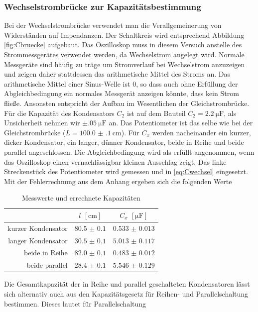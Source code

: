 \subsubsection{Wechselstrombrücke zur Kapazitätsbestimmung}
Bei der Wechselstrombrücke verwendet man die Verallgemeinerung von Widerständen auf Impendanzen. Der Schaltkreis wird entsprechend Abbildung \ref{fig:Cbruecke} aufgebaut. Das Oszilloskop muss in diesem Versuch anstelle des Strommessgerätes verwendet werden, da Wechselstrom angelegt wird. Normale Messgeräte sind häufig zu träge um Stromverlauf bei Wechselstrom anzuzeigen und zeigen daher stattdessen das arithmetische Mittel des Stroms an. Das arithmetische Mittel einer Sinus-Welle ist $ 0 $, so dass auch ohne Erfüllung der Abgleichbedingung ein normales Messgerät anzeigen könnte, dass kein Strom fließe. Ansonsten entspricht der Aufbau im Wesentlichen der Gleichstrombrücke. Für die Kapazität des Kondensators $ C_2 $ ist auf dem Bauteil $ C_2 = \SI{2.2}{\micro\farad} $, als Unsicherheit nehmen wir $ \pm \SI{.05}{\micro\farad} $ an. Das Potentiometer ist das selbe wie bei der Gleichstrombrücke ($ L = \SI{100.0(1)}{\centi\meter} $). Für $ C_x $ werden nacheinander ein kurzer, dicker Kondensator, ein langer, dünner Kondensator, beide in Reihe und beide parallel angeschlossen. Die Abgleichbedingung wird als erfüllt angenommen, wenn das Oszilloskop einen vernachlässigbar kleinen Ausschlag zeigt. Das linke Streckenstück des Potentiometer wird gemessen und in \eqref{eq:Cwechsel} eingesetzt. Mit der Fehlerrechnung aus dem Anhang ergeben sich die folgenden Werte
\begin{table}[H]
	\centering
	\begin{tabular}{r|cc}
		 & $ l $ $ [\si{\centi\meter}] $ & $ C_x $ $ [\si{\micro\farad}] $ \\\hline
		 kurzer Kondensator & $ \num{80.5(01)} $ & $ \num{0.533(0013)} $\\
		 langer Kondensator & $ \num{30.5(01)} $ & $ \num{5.013(0117)} $\\
		 beide in Reihe & $ \num{82.0(01)} $ & $ \num{0.483(0012)} $\\
		 beide parallel & $ \num{28.4(01)} $ & $ \num{5.546(0129)} $\\
	\end{tabular}
	\caption{Messwerte und errechnete Kapazitäten}
\end{table}
Die Gesamtkapazität der in Reihe und parallel geschalteten Kondensatoren lässt sich alternativ auch aus den Kapazitätsgesetz für Reihen- und Parallelschaltung bestimmen. Dieses lautet für Parallelschaltung

